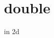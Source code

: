 \hypertarget{double-example}{}\section{double}

\begin{DoxyCodeInclude}{0}
\end{DoxyCodeInclude}
 in 2d


\begin{DoxyCodeInclude}{0}
\end{DoxyCodeInclude}
 